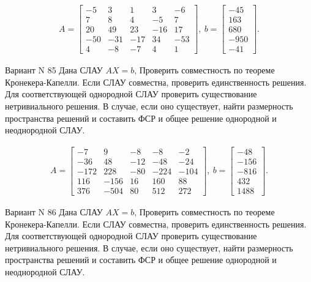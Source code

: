 \documentclass[11pt]{report}
\begin{document}
\begin{align*}
 A = \left[\begin{matrix}-5 & 3 & 1 & 3 & -6\\7 & 8 & 4 & -5 & 7\\20 & 49 & 23 & -16 & 17\\-50 & -31 & -17 & 34 & -53\\4 & -8 & -7 & 4 & 1\end{matrix}\right],
\ b = \left[\begin{matrix}-45\\163\\680\\-950\\-41\end{matrix}\right]. 
 \end{align*}

Вариант N 85
Дана СЛАУ $AX = b$,
Проверить совместность по теореме Кронекера-Капелли. Если СЛАУ совместна, проверить единственность решения.
Для соответствующей однородной СЛАУ проверить существование нетривиального решения. В случае, если оно существует,
найти размерность пространства решений и составить ФСР и общее решение однородной  и неоднородной СЛАУ.


\begin{align*}
 A = \left[\begin{matrix}-7 & 9 & -8 & -8 & -2\\-36 & 48 & -12 & -48 & -24\\-172 & 228 & -80 & -224 & -104\\116 & -156 & 16 & 160 & 88\\376 & -504 & 80 & 512 & 272\end{matrix}\right],
\ b = \left[\begin{matrix}-48\\-156\\-816\\432\\1488\end{matrix}\right]. 
 \end{align*}

Вариант N 86
Дана СЛАУ $AX = b$,
Проверить совместность по теореме Кронекера-Капелли. Если СЛАУ совместна, проверить единственность решения.
Для соответствующей однородной СЛАУ проверить существование нетривиального решения. В случае, если оно существует,
найти размерность пространства решений и составить ФСР и общее решение однородной  и неоднородной СЛАУ.
\end{document}
